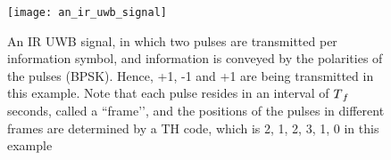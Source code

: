 \documentclass[../../main.tex]{subfiles}
\begin{document}
\begin{figure}[!htbp]
    \centering
    \texttt{[image: an\_ir\_uwb\_signal]}
    \caption{An IR UWB signal, in which two pulses are transmitted per information symbol, and information is conveyed by the polarities of the pulses (BPSK). Hence, +1, -1 and +1 are being transmitted in this example. Note that each pulse resides in an interval of $T\textsubscript{$f$}$ seconds, called a “frame’’, and the positions of the pulses in different frames are determined by a TH code, which is {2, 1, 2, 3, 1, 0} in this example}
    \label{fig:an_ir_uwb_signal}
\end{figure}
\end{document}
